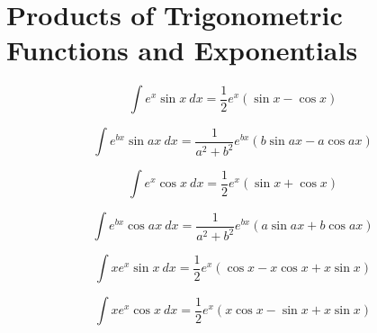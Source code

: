 \section*{Products of Trigonometric Functions and Exponentials}

\begin{equation}
\int e^x \sin x \ dx = \frac{1}{2}e^x (\sin x - \cos x) 
\end{equation}

\begin{equation}\label{eq:ritzert}
\int e^{bx} \sin ax\ dx = \frac{1}{a^2+b^2}e^{bx} (b\sin ax - a\cos ax) 
\end{equation}

\begin{equation}
\int e^x \cos x\ dx = \frac{1}{2}e^x (\sin x + \cos x)  
\end{equation}

\begin{equation}
\int e^{bx} \cos ax\ dx = \frac{1}{a^2 + b^2} e^{bx} ( a \sin ax + b \cos ax ) 
\end{equation}

\begin{equation}
\int x e^x \sin x\ dx = \frac{1}{2}e^x (\cos x - x \cos x + x \sin x) 
\end{equation}

\begin{equation}
\int x e^x \cos x\ dx = \frac{1}{2}e^x (x \cos x 
- \sin x + x \sin x) 
\end{equation}

